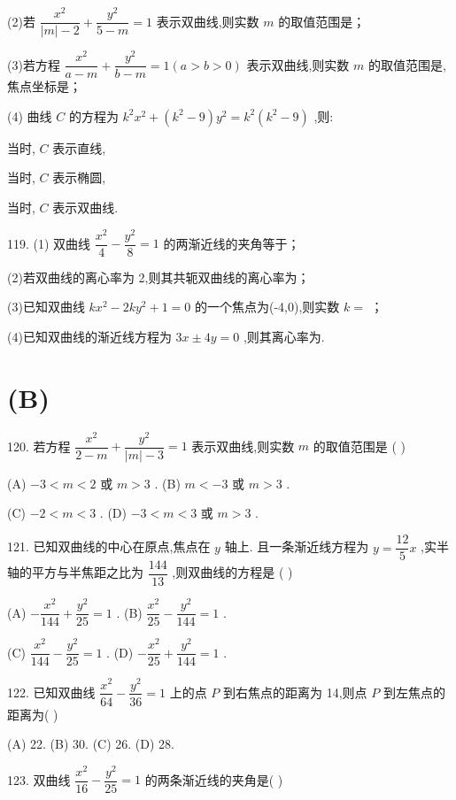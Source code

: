 (2)若 $\dfrac{{x}^{2}}{\left| m\right|  - 2} + \dfrac{{y}^{2}}{5 - m} = 1$ 表示双曲线,则实数 $m$ 的取值范围是\blkda{}；

(3)若方程 $\dfrac{{x}^{2}}{a - m} + \dfrac{{y}^{2}}{b - m} = 1\left( {a > b > 0}\right)$ 表示双曲线,则实数 $m$ 的取值范围是\blkda{}, 焦点坐标是\blkda{}；

(4) 曲线 $C$ 的方程为 ${k}^{2}{x}^{2} + \left( {{k}^{2} - 9}\right) {y}^{2} = {k}^{2}\left( {{k}^{2} - 9}\right)$ ,则:

当\blkda{}时, $C$ 表示直线,

当\blkda{}时, $C$ 表示椭圆,

当\blkda{}时, $C$ 表示双曲线.

119. (1) 双曲线 $\dfrac{{x}^{2}}{4} - \dfrac{{y}^{2}}{8} = 1$ 的两渐近线的夹角等于\blkda{}；

(2)若双曲线的离心率为 2,则其共轭双曲线的离心率为\blkda{}；

(3)已知双曲线 $k{x}^{2} - {2k}{y}^{2} + 1 = 0$ 的一个焦点为(-4,0),则实数 $k =$ \blkda{}；

(4)已知双曲线的渐近线方程为 ${3x} \pm  {4y} = 0$ ,则其离心率为\blkda{}.

\section*{(B)}

120. 若方程 $\dfrac{{x}^{2}}{2 - m} + \dfrac{{y}^{2}}{\left| m\right|  - 3} = 1$ 表示双曲线,则实数 $m$ 的取值范围是 (   )

(A) $- 3 < m < 2$ 或 $m > 3$ . (B) $m <  - 3$ 或 $m > 3$ .

(C) $- 2 < m < 3$ . (D) $- 3 < m < 3$ 或 $m > 3$ .

121. 已知双曲线的中心在原点,焦点在 $y$ 轴上. 且一条渐近线方程为 $y = \dfrac{12}{5}x$ ,实半轴的平方与半焦距之比为 $\dfrac{144}{13}$ ,则双曲线的方程是 (   )

(A) $- \dfrac{{x}^{2}}{144} + \dfrac{{y}^{2}}{25} = 1$ . (B) $\dfrac{{x}^{2}}{25} - \dfrac{{y}^{2}}{144} = 1$ .

(C) $\dfrac{{x}^{2}}{144} - \dfrac{{y}^{2}}{25} = 1$ . (D) $- \dfrac{{x}^{2}}{25} + \dfrac{{y}^{2}}{144} = 1$ .

122. 已知双曲线 $\dfrac{{x}^{2}}{64} - \dfrac{{y}^{2}}{36} = 1$ 上的点 $P$ 到右焦点的距离为 14,则点 $P$ 到左焦点的距离为(   )

(A) 22. (B) 30. (C) 26. (D) 28.

123. 双曲线 $\dfrac{{x}^{2}}{16} - \dfrac{{y}^{2}}{25} = 1$ 的两条渐近线的夹角是(   )

